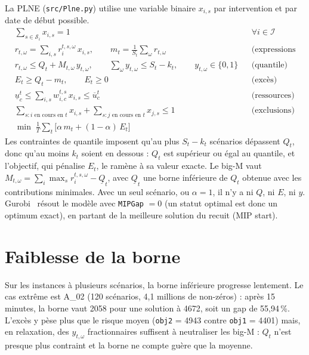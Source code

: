 \documentclass[11pt,a4paper]{report}
\newcommand{\I}{\mathcal{I}}
\newcommand{\Sd}{\mathcal{S}}
\begin{document}
La PLNE (\texttt{src/Plne.py}) utilise une variable binaire $x_{i,s}$ par intervention et par date
de début possible.
\begin{align*}
  & \textstyle\sum_{s \in \Sd_i} x_{i,s} = 1 && \forall i \in \I \\
  & r_{t,\omega} = \textstyle\sum_{i,s} r_i^{t,s,\omega} \, x_{i,s}, \qquad
    m_t = \frac{1}{S_t} \sum_\omega r_{t,\omega} && \text{(expressions linéaires)} \\
  & r_{t,\omega} \le Q_t + M_{t,\omega} \, y_{t,\omega}, \qquad
    \textstyle\sum_\omega y_{t,\omega} \le S_t - k_t, \qquad y_{t,\omega} \in \{0, 1\} && \text{(quantile)} \\
  & E_t \ge Q_t - m_t, \qquad E_t \ge 0 && \text{(excès)} \\
  & \underline{u}_c^t \le \textstyle\sum_{i,s} w_{i,c}^{t,s} \, x_{i,s} \le \overline{u}_c^t && \text{(ressources)} \\
  & \textstyle\sum_{s : i \text{ en cours en } t} x_{i,s} + \sum_{s : j \text{ en cours en } t} x_{j,s} \le 1
    && \text{(exclusions)} \\
  & \min \; \frac{1}{T} \textstyle\sum_t \big[ \alpha \, m_t + (1 - \alpha) \, E_t \big]
\end{align*}
Les contraintes de quantile imposent qu'au plus $S_t - k_t$ scénarios dépassent $Q_t$, donc qu'au
moins $k_t$ soient en dessous : $Q_t$ est supérieur ou égal au quantile, et l'objectif, qui pénalise
$E_t$, le ramène à sa valeur exacte. Le big-M vaut
$M_{t,\omega} = \sum_i \max_s r_i^{t,s,\omega} - \underline{Q}_t$, avec $\underline{Q}_t$ une borne
inférieure de $Q_t$ obtenue avec les contributions minimales. Avec un seul scénario, ou $\alpha = 1$,
il n'y a ni $Q$, ni $E$, ni $y$. Gurobi~\cite{gurobi} résout le modèle avec \texttt{MIPGap} $= 0$ (un
statut optimal est donc un optimum exact), en partant de la meilleure solution du recuit (MIP start).

\section{Faiblesse de la borne}

Sur les instances à plusieurs scénarios, la borne inférieure progresse lentement. Le cas extrême est
A\_02 (120 scénarios, 4,1 millions de non-zéros) : après 15 minutes, la borne vaut 2058 pour une
solution à 4672, soit un gap de 55,94\,\%. L'excès y pèse plus que le risque moyen
(\texttt{obj2} = 4943 contre \texttt{obj1} = 4401) mais, en relaxation, des $y_{t,\omega}$
fractionnaires suffisent à neutraliser les big-M : $Q_t$ n'est presque plus contraint et la borne ne
compte guère que la moyenne.
\end{document}
